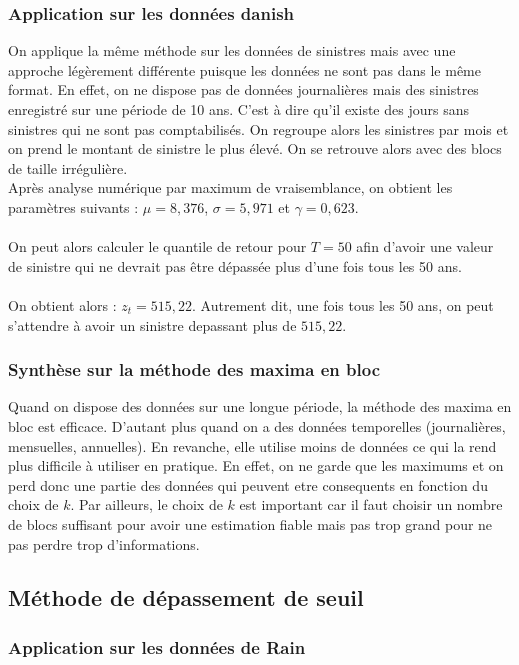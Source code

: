 \documentclass{article}
\theoremstyle{plain}
\theoremstyle{definition}
\theoremstyle{plain}
\begin{document}
\subsubsection{Application sur les données danish}
\noindent On applique la même méthode sur les données de sinistres mais avec une approche légèrement différente puisque les données ne sont pas dans le même format. En effet, on ne dispose pas de données journalières mais des sinistres enregistré sur une période de 10 ans. C'est à dire qu'il existe des jours sans sinistres qui ne sont pas comptabilisés.
On regroupe alors les sinistres par mois et on prend le montant de sinistre le plus élevé. On se retrouve alors avec des blocs de taille irrégulière.
\\
Après analyse numérique par maximum de vraisemblance, on obtient les paramètres suivants : $\mu = 8,376$, $\sigma = 5,971$ et $\gamma = 0,623$.
\\
\\
On peut alors calculer le quantile de retour pour $T=50$ afin d'avoir une valeur de sinistre qui ne devrait pas être dépassée plus d'une fois tous les 50 ans.
\\
\\
On obtient alors : $z_t = 515,22$. Autrement dit, une fois tous les 50 ans, on peut s'attendre à avoir un sinistre depassant plus de $515,22$.

\subsubsection{Synthèse sur la méthode des maxima en bloc}

\noindent Quand on dispose des données sur une longue période, la méthode des maxima en bloc est efficace. D'autant plus quand on a des données temporelles (journalières, mensuelles, annuelles).
En revanche, elle utilise moins de données ce qui la rend plus difficile à utiliser en pratique. En effet, on ne garde que les maximums et on perd donc une partie des données qui peuvent etre consequents en fonction du choix de $k$.
Par ailleurs, le choix de $k$ est important car il faut choisir un nombre de blocs suffisant pour avoir une estimation fiable mais pas trop grand pour ne pas perdre trop d'informations.

\subsection{Méthode de dépassement de seuil}


\subsubsection{Application sur les données de Rain}
\end{document}
